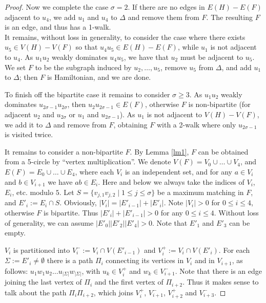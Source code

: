 \documentclass{amsart}
\theoremstyle{definition}
\begin{document}
\begin{proof}
Now we complete the case $\sigma=2$. 
If there are no edges in $E(H)-E(F)$ adjacent to $u_4$, 
we add $u_1$ and $u_4$ to $\Delta$ and remove them from $F$. 
The resulting $F$ is an edge, and thus has a 1-walk.\\
It remains, without loss in generality,
to consider the case where there exists $u_5\in V(H)-V(F)$ so that
$u_4u_5\in E(H)-E(F)$, while $u_1$ is not
adjacent to $u_4$. As $u_1u_2$ weakly dominates $u_4u_5$, we have that $u_2$ must be 
adjacent to $u_5$. 
We set $F$ to be the subgraph induced by
$u_2,\dots,u_5$, remove $u_5$ from $\Delta$, and add $u_1$ to $\Delta$; then $F$ is Hamiltonian, and we are done.

To finish off the bipartite case it remains to consider $\sigma\geq 3$.
As $u_1u_2$ weakly dominates $u_{2\sigma-1}u_{2\sigma}$, then $u_2u_{2\sigma-1}\in E(F)$, 
otherwise $F$ is
non-bipartite (for adjacent $u_2$ and $u_{2\sigma}$ or $u_1$ and $u_{2\sigma-1}$).
As $u_1$ is not adjacent to   $V(H)-V(F)$, we add it to $\Delta$ and remove from $F$,
obtaining $F$ with a 2-walk where only $u_{2\sigma-1}$ is visited twice. 


\medskip

It remains to consider a non-bipartite $F$. By Lemma \ref{lm1},
$F$ can be obtained from a 5-circle by ``vertex multiplication''. We
denote $V(F)=V_0\cup \dots \cup V_4$, and
$E(F)=E_0\cup \dots \cup E_4$, where each $V_i$ is an
independent set, and  for any $a\in V_i$ and $b\in V_{i+1}$ we have $ab\in E_i$. 
Here and below we always take the indices of $V_i$, $E_i$, etc. modulo $5$.
Let $S=\{v_{j,1}v_{j,2}\mid 1\leq j\leq \sigma\}$ be a maximum matching in $F$, and $E'_i:=E_i\cap S$.
Obviously,
$|V_i|=|E'_{i-1}|+|E'_i|$. Note $|V_i|>0$ for $0\leq i\leq 4$, otherwise
$F$ is bipartite. Thus $|E'_i|+|E'_{i-1}|>0$ for any $0\leq i\leq 4$. 
Without loss of generality, we can assume $|E'_0||E'_2||E'_4|>0$.
Note that $E'_1$ and $E'_3$ can be empty.

$V_i$ is partitioned into
$V_i^-:= V_i\cap V(E'_{i-1})$ and 
$V_i^+:= V_i\cap V(E'_{i})$. For each $\Sigma:=E'_i\neq\emptyset$ there is
a path $\Pi_i$ connecting its vertices in $V_i$ and in $V_{i+1}$, 
as follows: $u_1 w_1 u_2\dots u_{|\Sigma|}w_{|\Sigma|}$, with 
$u_k\in V_i^+$ and $w_k\in V_{i+1}^-$.%
Note that there is an edge joining the last vertex of $\Pi_i$ and
the first vertex of $\Pi_{i+2}$. Thus it makes sense to talk about the path
$\Pi_i\Pi_{i+2}$, which joins $V_i^+$, $V_{i+1}^-$, $V_{i+2}^+$ and
$V_{i+3}^-$.


\end{proof}
\end{document}
